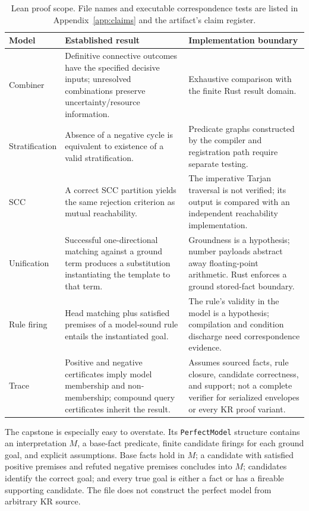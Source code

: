 \begin{table}[t]
\centering\small
\begin{tabular}{p{2.3cm}p{5.8cm}p{6.0cm}}
\toprule
Model & Established result & Implementation boundary \\
\midrule
Combiner & Definitive connective outcomes have the specified decisive inputs;
unresolved combinations preserve uncertainty/resource information. &
Exhaustive comparison with the finite Rust result domain. \\
Stratification & Absence of a negative cycle is equivalent to existence of a
valid stratification. & Predicate graphs constructed by the compiler and
registration path require separate testing. \\
SCC & A correct SCC partition yields the same rejection criterion as
mutual reachability. & The imperative Tarjan traversal is not verified;
its output is compared with an independent reachability implementation. \\
Unification & Successful one-directional matching against a ground term
produces a substitution instantiating the template to that term. &
Groundness is a hypothesis; number payloads abstract away floating-point
arithmetic. Rust enforces a ground stored-fact boundary. \\
Rule firing & Head matching plus satisfied premises of a model-sound rule
entails the instantiated goal. & The rule's validity in the model is a
hypothesis; compilation and condition discharge need correspondence evidence. \\
Trace & Positive and negative certificates imply model membership and
non-membership; compound query certificates inherit the result. &
Assumes sourced facts, rule closure, candidate correctness, and support;
not a complete verifier for serialized envelopes or every KR proof variant. \\
\bottomrule
\end{tabular}
\caption{Lean proof scope. File names and executable correspondence tests are
listed in Appendix~\ref{app:claims} and the artifact's claim register.}
\label{tab:proof-scope}
\end{table}

The capstone is especially easy to overstate. Its \texttt{PerfectModel} structure
contains an interpretation $M$, a base-fact predicate, finite candidate firings
for each ground goal, and explicit assumptions. Base facts hold in $M$;
a candidate with satisfied positive premises and refuted negative premises
concludes into $M$; candidates identify the correct goal; and every true goal
is either a fact or has a fireable supporting candidate. The file does not
construct the perfect model from arbitrary KR source.


